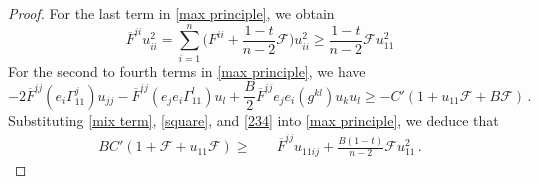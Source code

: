 \documentclass{article}
\theoremstyle{plain}
\theoremstyle{definition}
\theoremstyle{definition}
\numberwithin{equation}{section}
\begin{document}
\begin{sloppypar}
\begin{proof}
For the last term in \eqref{max principle}, we obtain
\begin{equation}\label{square}
\overline{F}^{ii}u_{ii}^{2}=\sum_{i=1}^{n}\Big( F^{ii}+\frac{1-t}{n-2}\mathcal{F}\Big)u_{ii}^{2}\geq \frac{1-t}{n-2}\mathcal{F} u_{11}^{2}
\end{equation}
For the second to fourth terms in \eqref{max principle}, we have
\begin{equation}\label{234}
-2\overline{F}^{ij}(e_{i}\Gamma_{11}^{j})u_{jj}-\overline{F}^{ij}(e_{j}e_{i}\Gamma_{11}^{l})u_{l} +\frac{B}{2}\overline{F}^{ij}e_{j}e_{i}(g^{kl})u_{k}u_{l}\geq - C'(1+u_{11}\mathcal{F}+B \mathcal{F})\,.
\end{equation}
Substituting \eqref{mix term}, \eqref{square}, and \eqref{234} into \eqref{max principle}, we deduce that
\begin{equation}\label{max principle v2}
\begin{split}
BC' (1+\mathcal{F}+u_{11}\mathcal{F} )\geq &\quad \overline{F}^{ij} u_{11ij}+\frac{B(1-t)}{n-2}\mathcal{F} u_{11}^{2}\,.
\end{split}
\end{equation}



\end{proof}
\end{sloppypar}
\end{document}
